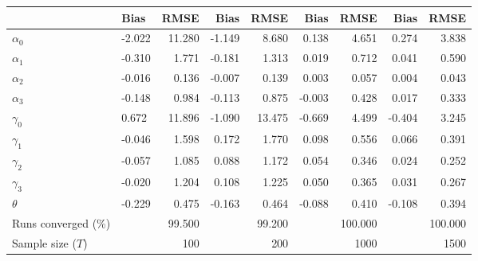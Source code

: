 
\begin{tabular}[t]{llrrrrrrr}
\toprule
  & Bias & RMSE & Bias & RMSE & Bias & RMSE & Bias & RMSE\\
\midrule
$\alpha_{0}$ & -2.022 & 11.280 & -1.149 & 8.680 & 0.138 & 4.651 & 0.274 & 3.838\\
$\alpha_{1}$ & -0.310 & 1.771 & -0.181 & 1.313 & 0.019 & 0.712 & 0.041 & 0.590\\
$\alpha_{2}$ & -0.016 & 0.136 & -0.007 & 0.139 & 0.003 & 0.057 & 0.004 & 0.043\\
$\alpha_{3}$ & -0.148 & 0.984 & -0.113 & 0.875 & -0.003 & 0.428 & 0.017 & 0.333\\
$\gamma_{0}$ & 0.672 & 11.896 & -1.090 & 13.475 & -0.669 & 4.499 & -0.404 & 3.245\\
$\gamma_{1}$ & -0.046 & 1.598 & 0.172 & 1.770 & 0.098 & 0.556 & 0.066 & 0.391\\
$\gamma_{2}$ & -0.057 & 1.085 & 0.088 & 1.172 & 0.054 & 0.346 & 0.024 & 0.252\\
$\gamma_{3}$ & -0.020 & 1.204 & 0.108 & 1.225 & 0.050 & 0.365 & 0.031 & 0.267\\
$\theta$ & -0.229 & 0.475 & -0.163 & 0.464 & -0.088 & 0.410 & -0.108 & 0.394\\
Runs converged (\%) &  & 99.500 &  & 99.200 &  & 100.000 &  & 100.000\\
Sample size ($T$) &  & 100 &  & 200 &  & 1000 &  & 1500\\
\bottomrule
\end{tabular}
